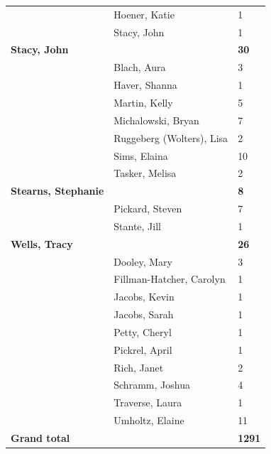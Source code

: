 \documentclass{article}\usepackage[]{graphicx}\usepackage[]{color}
\begin{document}
{\begin{longtable} { >{\raggedright}p{}|p{}p{}}
   & Hoener, Katie & 1 \\ 
   \rowcolor[gray]{0.90} & Stacy, John & 1 \\ 
   \rowcolor[gray]{0.90}\textbf{Stacy, John} &  & \hspace{2cm}\textbf{30} \\ 
   \rowcolor[gray]{0.90} & Blach, Aura & 3 \\ 
   & Haver, Shanna & 1 \\ 
   & Martin, Kelly & 5 \\ 
   & Michalowski, Bryan & 7 \\ 
   \rowcolor[gray]{0.90} & Ruggeberg (Wolters), Lisa & 2 \\ 
   \rowcolor[gray]{0.90} & Sims, Elaina & 10 \\ 
   \rowcolor[gray]{0.90} & Tasker, Melisa & 2 \\ 
  \textbf{Stearns, Stephanie} &  & \hspace{2cm}\textbf{8} \\ 
   & Pickard, Steven & 7 \\ 
   & Stante, Jill & 1 \\ 
   \rowcolor[gray]{0.90}\textbf{Wells, Tracy} &  & \hspace{2cm}\textbf{26} \\ 
   \rowcolor[gray]{0.90} & Dooley, Mary & 3 \\ 
   \rowcolor[gray]{0.90} & Fillman-Hatcher, Carolyn & 1 \\ 
   & Jacobs, Kevin & 1 \\ 
   & Jacobs, Sarah & 1 \\ 
   & Petty, Cheryl & 1 \\ 
   \rowcolor[gray]{0.90} & Pickrel, April & 1 \\ 
   \rowcolor[gray]{0.90} & Rich, Janet & 2 \\ 
   \rowcolor[gray]{0.90} & Schramm, Joshua & 4 \\ 
   & Traverse, Laura & 1 \\ 
   & Umholtz, Elaine & 11 \\ 
  \textbf{Grand total} &  & \textbf{1291} \\ 
   \end{longtable}

}

\pagebreak
\end{document}
